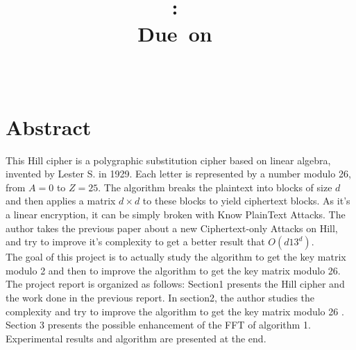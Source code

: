 \documentclass{article}
\title{
\vspace{2in}
\textmd{\textbf{\hmwkClass:\ \hmwkTitle}}\\
\normalsize\vspace{0.1in}\small{Due\ on\ \hmwkDueDate}\\
\vspace{0.1in}\large{\textit{\hmwkClassInstructor\ \hmwkClassTime}}
\vspace{3in}
}
\author{\textbf{\hmwkAuthorName}}
\date{} %
\begin{document}
\maketitle


\newpage
\section{Abstract}
This Hill cipher is a polygraphic substitution cipher based on linear algebra, invented by 
Lester S. in 1929. Each letter is represented by a number modulo 26, from $A=0$ to $Z=25$. The algorithm breaks the plaintext into blocks of size $d$ and then applies a matrix $d \times d $ to these blocks to yield ciphertext blocks. As it's a linear encryption, it can be simply broken with Know PlainText Attacks.
The author takes the previous paper about a new Ciphertext-only Attacks on Hill, and try to improve it's complexity to get a better result that $O(d13^d)$.\\
${}$\hspace{1em}The goal of this project is to actually study the algorithm to get the key matrix modulo 2 and then to improve the algorithm to get the key matrix modulo 26.\\
${}$\hspace{1em}The project report is organized as follows: Section1 presents the Hill cipher and the work done in the previous report. In section2, the author studies the complexity and try to improve the algorithm to get the key matrix modulo 26 . Section 3 presents the possible enhancement of the FFT of algorithm 1. Experimental results and algorithm are presented at the end.



\newpage
\tableofcontents
\newpage





\end{document}
